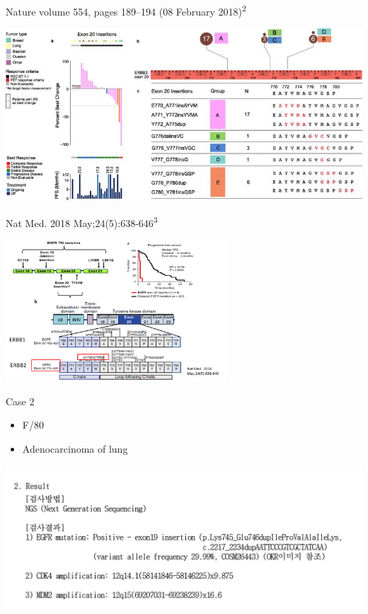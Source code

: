 \documentclass[
  ignorenonframetext,
]{beamer}
\providecommand{\tightlist}{%
  \setlength{\itemsep}{0pt}\setlength{\parskip}{0pt}}
\begin{document}
\begin{frame}{Nature volume 554, pages 189--194 (08 February
2018)\textsuperscript{2}}
\protect\hypertarget{nature-volume-554-pages-189194-08-february-2018--hyman_2018_her_nature}{}

\includegraphics{assets/img/nature25475-sf4.jpg}

\end{frame}

\begin{frame}{Nat Med. 2018 May;24(5):638-646\textsuperscript{3}}
\protect\hypertarget{nat-med.-2018-may245638-646--robichaux_2018_mechanisms_natmed}{}

\includegraphics[width=\textwidth,height=2.08333in]{assets/img/TKI_resistance.png}

\end{frame}

\begin{frame}{Case 2}
\protect\hypertarget{case-2}{}

\begin{itemize}
\tightlist
\item
  F/80
\item
  Adenocarcinoma of lung
\end{itemize}

\end{frame}

\begin{frame}

\includegraphics{assets/img/EGFR.png}

\end{frame}
\end{document}
